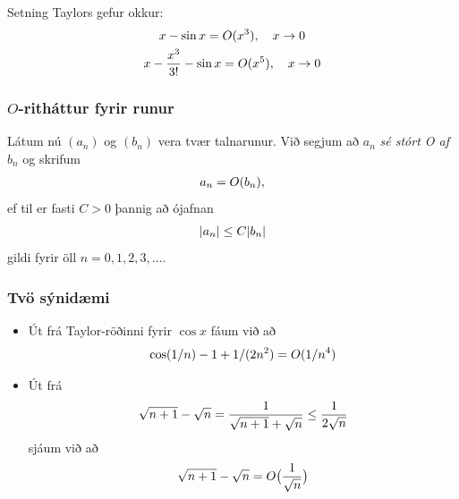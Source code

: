 \documentclass[a4paper,10pt,icelandic]{sphinxmanual}
\begin{document}
Setning Taylors gefur okkur:
\begin{gather}
\begin{split}\begin{gathered}
    x - \sin x = O(x^3), \quad x \to 0\\
    x - \frac{x^3}{3!} - \sin x = O(x^5), \quad x \to 0\end{gathered}\end{split}\notag
\end{gather}

\subsubsection{\(O\)-ritháttur fyrir runur}
\label{kafli01:index-14}\label{kafli01:rithattur-fyrir-runur}
Látum nú \((a_n)\) og \((b_n)\) vera tvær talnarunur. Við segjum
að \(a_n\) \emph{sé stórt O af} \(b_n\) og skrifum
\begin{gather}
\begin{split}a_n = O(b_n),\end{split}\notag
\end{gather}
ef til er fasti \(C>0\) þannig að ójafnan
\begin{gather}
\begin{split}|a_n| \leq C|b_n|\end{split}\notag
\end{gather}
gildi fyrir öll \(n=0,1,2,3,\dots\).


\subsubsection{Tvö sýnidæmi}
\label{kafli01:tvo-synidaemi}\begin{itemize}
\item {} 
Út frá Taylor-röðinni fyrir \(\cos x\) fáum við að
\begin{gather}
\begin{split}\cos(1/n)-1+1/(2n^2) = O(1/n^4)\end{split}\notag
\end{gather}
\item {} 
Út frá
\begin{gather}
\begin{split}\sqrt{n+1}-\sqrt n = \dfrac{1}{\sqrt{n+1}+\sqrt n} \leq \frac{1}{2\sqrt n}\end{split}\notag
\end{gather}
sjáum við að
\begin{gather}
\begin{split}\sqrt{n+1}-\sqrt n = O\big(\dfrac 1{\sqrt n}\big)\end{split}\notag
\end{gather}
\end{itemize}
\end{document}

